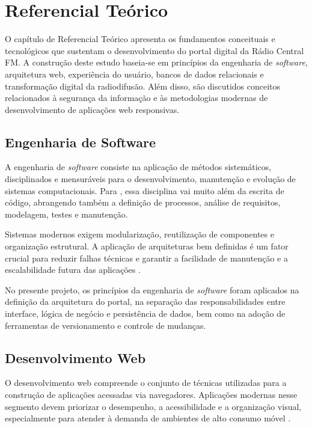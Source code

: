 \documentclass[12pt, openright, oneside, a4paper, brazil]{ads-unipac-abntex2}
\begin{document}
\chapter[Referencial Teórico]{Referencial Teórico}

O capítulo de Referencial Teórico apresenta os fundamentos conceituais e tecnológicos que sustentam o desenvolvimento do portal digital da Rádio Central FM. A construção deste estudo baseia-se em princípios da engenharia de \textit{software}, arquitetura web, experiência do usuário, bancos de dados relacionais e transformação digital da radiodifusão. Além disso, são discutidos conceitos relacionados à segurança da informação e às metodologias modernas de desenvolvimento de aplicações web responsivas.

\section{Engenharia de Software}

A engenharia de \textit{software} consiste na aplicação de métodos sistemáticos, disciplinados e mensuráveis para o desenvolvimento, manutenção e evolução de sistemas computacionais. Para , essa disciplina vai muito além da escrita de código, abrangendo também a definição de processos, análise de requisitos, modelagem, testes e manutenção. 

Sistemas modernos exigem modularização, reutilização de componentes e organização estrutural. A aplicação de arquiteturas bem definidas é um fator crucial para reduzir falhas técnicas e garantir a facilidade de manutenção e a escalabilidade futura das aplicações \cite{pressman}.

No presente projeto, os princípios da engenharia de \textit{software} foram aplicados na definição da arquitetura do portal, na separação das responsabilidades entre interface, lógica de negócio e persistência de dados, bem como na adoção de ferramentas de versionamento e controle de mudanças.

\section{Desenvolvimento Web}

O desenvolvimento web compreende o conjunto de técnicas utilizadas para a construção de aplicações acessadas via navegadores. Aplicações modernas nesse segmento devem priorizar o desempenho, a acessibilidade e a organização visual, especialmente para atender à demanda de ambientes de alto consumo móvel \cite{duckett}.
\end{document}
